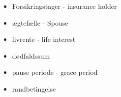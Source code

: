 \begin{itemize}
	\item Forsikringstager - insurance holder
	\item ægtefælle - Spouse
	\item livrente - life interest
	\item dødfaldssum
	\item pause periode - grace period
	\item randbetingelse
\end{itemize}